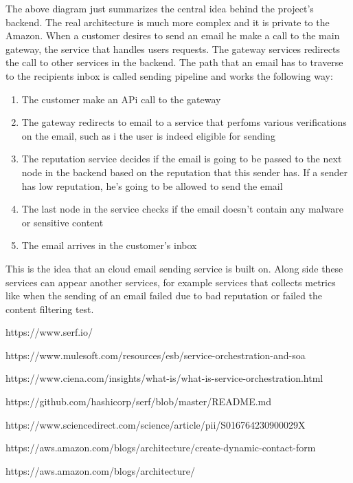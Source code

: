 \documentclass[12pt, oneside]{article}
\begin{document}
The above diagram just summarizes the central idea behind the project’s backend. The real
architecture is much more complex and it is private to the Amazon.
When a customer desires to send an email he make a call to the main gateway, the service
that handles users requests. The gateway services redirects the call to other services in the
backend. The path that an email has to traverse to the recipients inbox is called sending
pipeline and works the following way:

\begin{enumerate}
\item The customer make an APi call to the gateway
\item The gateway redirects to email to a service that perfoms various verifications on the email, such as i the user is indeed eligible for sending
\item The reputation service decides if the email is going to be passed to the next node in the backend based on the reputation that this sender has. If a sender has low reputation, he's going to be allowed to send the email
\item The last node in the service checks if the email doesn't contain any malware or sensitive content
\item The email arrives in the customer's inbox
\end{enumerate}

This is the idea that an cloud email sending service is built on. Along side these services can
appear another services, for example services that collects metrics like when the sending of
an email failed due to bad reputation or failed the content filtering test.





\cite{Marc-2009}


\newpage

\begin{thebibliography}{9}


https://www.serf.io/

https://www.mulesoft.com/resources/esb/service-orchestration-and-soa

https://www.ciena.com/insights/what-is/what-is-service-orchestration.html

https://github.com/hashicorp/serf/blob/master/README.md

https://www.sciencedirect.com/science/article/pii/S016764230900029X

https://aws.amazon.com/blogs/architecture/create-dynamic-contact-form

https://aws.amazon.com/blogs/architecture/
\end{thebibliography}	


	
\end{document}
